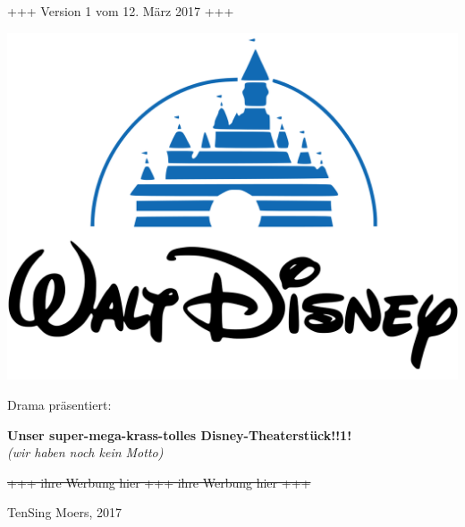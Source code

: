 \begin{center}
\phantom{asdf}
\vspace{-2cm}
+++ Version 1 vom 12. März 2017 +++

\includegraphics[scale=.3]{res/Walt_Disney_Pictures_Castle_Logo-Crop}

\vspace{-1cm}
\Huge{Drama präsentiert}:

\vspace{2cm}
\Huge\textbf{Unser super-mega-krass-tolles Disney-Theaterstück!!1!}\\
\textit{(wir haben noch kein Motto)}

\vspace{1cm}

\Large \st{+++ ihre Werbung hier +++ ihre Werbung hier +++}

\vspace{1.5cm}

\Large TenSing Moers, 2017
\end{center}
